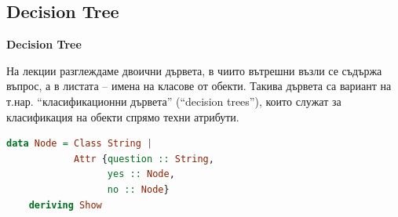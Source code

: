 \subsection {Decision Tree}

\begin{mdframed}[hidealllines=true,backgroundcolor=gray!20]
\textbf{Decision Tree}


На лекции разглеждаме двоични дървета, в чиито вътрешни възли се съдържа въпрос, а в листата -- имена на класове от обекти. Такива дървета са вариант на т.нар. ``класификационни дървета'' (``decision trees''), които служат за класификация на обекти спрямо техни атрибути.

\bigskip

\begin{lstlisting}[basicstyle=\small,language=Haskell]
data Node = Class String | 
            Attr {question :: String, 
                  yes :: Node, 
                  no :: Node} 
	deriving Show
\end{lstlisting}
\end{mdframed}

